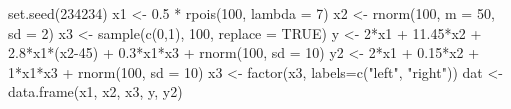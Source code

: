 \begin{Schunk}
\begin{Sinput}
 set.seed(234234)
 x1 <- 0.5 * rpois(100, lambda = 7)
 x2 <- rnorm(100, m = 50, sd = 2)
 x3 <- sample(c(0,1), 100, replace = TRUE)
 y <- 2*x1 + 11.45*x2 + 2.8*x1*(x2-45) + 0.3*x1*x3 + rnorm(100, sd = 10)
 y2 <- 2*x1 + 0.15*x2 + 1*x1*x3 + rnorm(100, sd = 10)
 x3 <- factor(x3, labels=c("left", "right"))
 dat <- data.frame(x1, x2, x3, y, y2)
\end{Sinput}
\end{Schunk}

